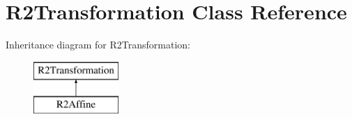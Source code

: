 \hypertarget{class_r2_transformation}{}\section{R2\+Transformation Class Reference}
\label{class_r2_transformation}
Inheritance diagram for R2\+Transformation\+:\begin{figure}[H]
\begin{center}
\leavevmode
\includegraphics[height=2.000000cm]{class_r2_transformation}
\end{center}
\end{figure}
